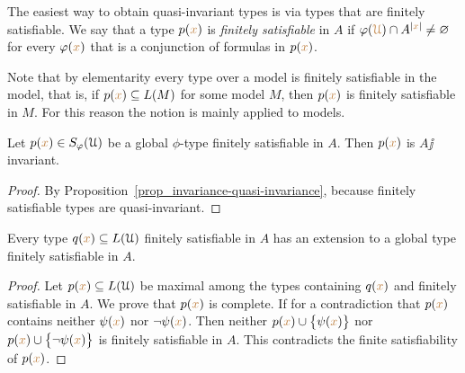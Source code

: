 \documentclass[creche.tex]{subfiles}
\begin{document}
The easiest way to obtain quasi-invariant types is via types that are finitely satisfiable. We say that a type $p({\color{brown} x})$ is  \emph{finitely satisfiable\/} in $A$ if $\varphi({\color{brown}\EuScript U})\cap A^{|{\color{brown} x}|}\neq\varnothing$ for every $\varphi({\color{brown} x})$ that is a conjunction of formulas in $p({\color{brown} x})$.

Note that by elementarity every type over a model is finitely satisfiable in the model, that is, if $p({\color{brown} x})\subseteq L(M)$ for some model $M$, then $p({\color{brown} x})$ is finitely satisfiable in $M$. For this reason the notion is mainly applied to models.

\begin{proposition}\label{prop_coeredi_invarienti}
Let $p({\color{brown} x})\in S_{\varphi}(\EuScript U)$ be a global $\phi$-type finitely satisfiable in $A$. Then $p({\color{brown} x})$ is $A\jj$in\-vari\-ant.
\end{proposition}

\begin{proof}
By Proposition~\ref{prop_invariance-quasi-invariance}, because finitely satisfiable types are quasi-invariant.%
\end{proof}


\begin{proposition}\label{prop_exisntence_coheirs}
Every type $q({\color{brown} x})\subseteq L(\EuScript U)$ finitely satisfiable in $A$ has an extension to a global type finitely satisfiable in $A$.
\end{proposition}

\begin{proof} 
Let $p({\color{brown} x})\subseteq L(\EuScript U)$ be maximal among the types containing $q({\color{brown} x})$ and finitely satisfiable in $A$. We prove that $p({\color{brown} x})$ is complete. If for a contradiction that $p({\color{brown} x})$ contains neither $\psi({\color{brown} x})$ nor $\neg\psi({\color{brown} x})$. Then  neither $p({\color{brown} x})\cup\big\{\psi({\color{brown} x})\big\}$ nor $p({\color{brown} x})\cup\big\{\neg\psi({\color{brown} x})\big\}$ is finitely satisfiable in $A$. This contradicts the finite satisfiability of $p({\color{brown} x})$.
\end{proof}
\end{document}
